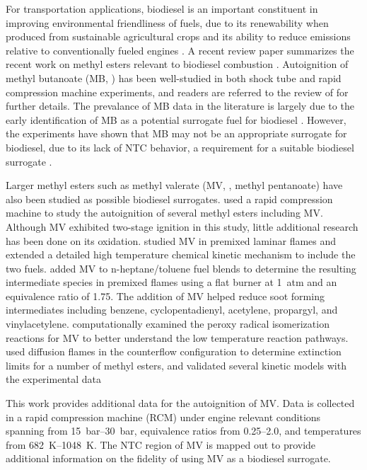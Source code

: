 \documentclass[12pt]{../ussci}
\begin{document}
For transportation applications, biodiesel is an important constituent in
improving environmental friendliness of fuels, due to its renewability when
produced from sustainable agricultural crops and its ability to reduce emissions
relative to conventionally fueled engines \autocite{Hoekman2012}. A recent
review paper summarizes the recent work on methyl esters relevant to biodiesel
combustion \autocite{Coniglio2013}. Autoignition of methyl butanoate (MB,
) has been well-studied in both shock tube and rapid compression
machine experiments, and readers are referred to the review of
\textcite{Coniglio2013} for further details. The prevalance of MB data in the
literature is largely due to the early identification of MB as a potential
surrogate fuel for biodiesel \autocite{Fisher2000}. However, the experiments
have shown that MB may not be an appropriate surrogate for biodiesel, due to its
lack of NTC behavior, a requirement for a suitable biodiesel surrogate
\autocite{Coniglio2013}.

Larger methyl esters such as methyl valerate (MV, , methyl
pentanoate) have also been studied as possible biodiesel surrogates.
\textcite{Hadj-Ali2009} used a rapid compression machine to study the
autoignition of several methyl esters including MV. Although MV exhibited
two-stage ignition in this study, little additional research has been done on
its oxidation. \textcite{Korobeinichev2015} studied MV in premixed laminar
flames and extended a detailed high temperature chemical kinetic mechanism to
include the two fuels. \textcite{Dmitriev2015} added MV to n-heptane/toluene
fuel blends to determine the resulting intermediate species in premixed flames
using a flat burner at \SI{1}{atm} and an equivalence ratio of 1.75. The
addition of MV helped reduce soot forming intermediates including benzene,
cyclopentadienyl, acetylene, propargyl, and vinylacetylene. \textcite{Hayes2009}
computationally examined the peroxy radical isomerization reactions for MV to
better understand the low temperature reaction pathways. \textcite{Dievart2013}
used diffusion flames in the counterflow configuration to determine extinction
limits for a number of methyl esters, and validated several kinetic models with
the experimental data

This work provides additional data for the autoignition of MV. Data is collected
in a rapid compression machine (RCM) under engine relevant conditions spanning
from \SIrange{15}{30}{\bar}, equivalence ratios from \numrange{0.25}{2.0}, and
temperatures from \SIrange{682}{1048}{\K}. The NTC region of MV is mapped out to
provide additional information on the fidelity of using MV as a biodiesel
surrogate.
\end{document}
